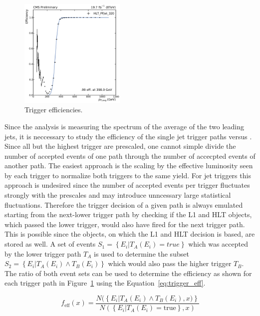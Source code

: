 \begin{figure}[htbp]
    \includegraphics[width=0.45\textwidth]{figures/measurement/trigger_eff_hltpfjet320.pdf}\hfill
    \caption{Trigger efficiencies.}
    \label{fig:trigger_eff}
\end{figure}


Since the analysis is measuring the spectrum of the average \pt of the two
leading jets, it is neccessary to study the efficiency of the single jet trigger paths
versus \ptavg. Since all but the highest \pt trigger are prescaled, one cannot
simple divide the number of accepted events of one path through the number of
accecpted events of another path. The easiest approach is the scaling by the
effective luminosity seen by each trigger to normalize both triggers to the same
yield. For jet triggers this approach is undesired since the number of accepted
events per trigger fluctuates strongly with the prescales and may introduce
unncessary large statistical fluctuations. Therefore the trigger decision  of a
given path is always emulated starting from the next-lower trigger path by checking
if the L1 and HLT objects, which passed the lower trigger, would also
have fired for the next trigger path. This is possible since the objects, on which
the L1 and HLT decision is based, are stored as well. A set of events $S_1 = \left\{E_i | T_A (E_i) = true \right\}$
which was accepted  by the lower trigger path $T_A$ is used to determine the subset
$S_2 = \left\{E_i|T_A(E_i) \wedge  T_B(E_i) \right\}$ which would also pass the higher trigger 
$T_B$. The ratio of both event sets can be used to determine the efficiency as shown for each trigger
path in Figure~\ref{fig:trigger_eff} using the Equation~\ref{eq:trigger_eff}. 

\begin{equation}
\label{eq:trigger_eff}
    f_{\text{eff}} (x) = \frac{N(\left\{E_i|T_A(E_i) \wedge T_B(E_i), x)\right\}}{N(\left\{ E_i | T_A(E_i) = \text{true} \right\} , x)}
\end{equation}

